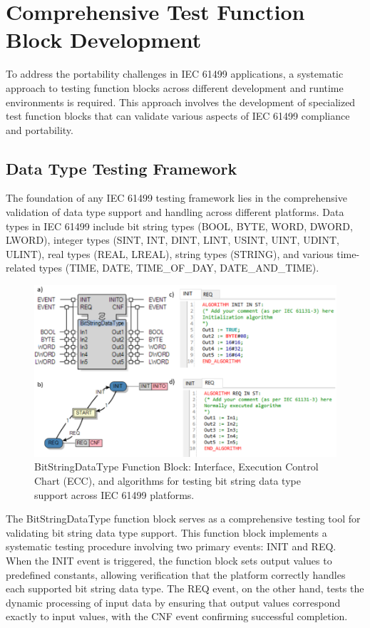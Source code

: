 \section{Comprehensive Test Function Block Development}

To address the portability challenges in IEC 61499 applications, a systematic approach to testing function blocks across different development and runtime environments is required. This approach involves the development of specialized test function blocks that can validate various aspects of IEC 61499 compliance and portability.

\subsection{Data Type Testing Framework}

The foundation of any IEC 61499 testing framework lies in the comprehensive validation of data type support and handling across different platforms. Data types in IEC 61499 include bit string types (BOOL, BYTE, WORD, DWORD, LWORD), integer types (SINT, INT, DINT, LINT, USINT, UINT, UDINT, ULINT), real types (REAL, LREAL), string types (STRING), and various time-related types (TIME, DATE, TIME\_OF\_DAY, DATE\_AND\_TIME).

\begin{figure}[!htbp]
    \centering
    \includegraphics[width=0.8\columnwidth]{MX_Papers/Paper8/Figures/BSDT.PNG}
    \caption{BitStringDataType Function Block: Interface, Execution Control Chart (ECC), and algorithms for testing bit string data type support across IEC 61499 platforms.}
    \label{fig:bitstring_test}
\end{figure}

The BitStringDataType function block serves as a comprehensive testing tool for validating bit string data type support. This function block implements a systematic testing procedure involving two primary events: INIT and REQ. When the INIT event is triggered, the function block sets output values to predefined constants, allowing verification that the platform correctly handles each supported bit string data type. The REQ event, on the other hand, tests the dynamic processing of input data by ensuring that output values correspond exactly to input values, with the CNF event confirming successful completion.

